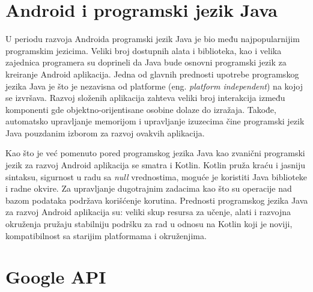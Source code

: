 \documentclass[../TamaraIvanovicMasterRad.tex]{subfiles}
\begin{document}
\section{Android i programski jezik Java}
U periodu razvoja Androida programski jezik Java je bio među najpopularnijim programskim jezicima. Veliki broj dostupnih alata i biblioteka, kao i velika zajednica programera su doprineli da Java bude osnovni programski jezik za kreiranje Android aplikacija. Jedna od glavnih prednosti upotrebe programskog jezika Java je što je nezavisna od platforme (eng. \textit{platform independent}) na kojoj se izvršava. Razvoj složenih aplikacija zahteva veliki broj interakcija između komponenti gde objektno-orijentisane osobine dolaze do izražaja. Takođe, automatsko upravljanje memorijom i upravljanje izuzecima čine programski jezik Java pouzdanim izborom za razvoj ovakvih aplikacija. 

Kao što je već pomenuto pored programskog jezika Java kao zvanični programski jezik za razvoj Android aplikacija se smatra i Kotlin. Kotlin pruža kraću i jasniju sintaksu, sigurnost u radu sa \textit{null} vrednostima, moguće je koristiti Java biblioteke i radne okvire. Za upravljanje dugotrajnim zadacima kao što su operacije nad bazom podataka podržava korišćenje korutina. Prednosti programskog jezika Java za razvoj Android aplikacija su: veliki skup resursa za učenje, alati i razvojna okruženja pružaju stabilniju podršku za rad u odnosu na Kotlin koji je noviji, kompatibilnost sa starijim platformama i okruženjima.


\section{Google API}\label{sec:google}

\end{document}
